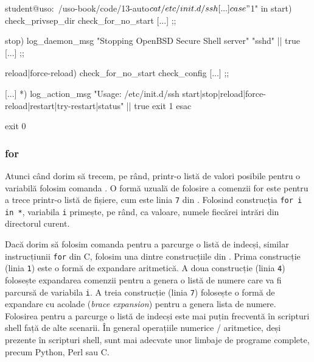 \begin{screen}[caption={Exemplu de folosire case: /etc/init.d/ssh},label={lst:auto:case-example}]
student@uso:~/uso-book/code/13-auto$ cat /etc/init.d/ssh
[...]
case "$1" in
  start)
	check_privsep_dir
	check_for_no_start
        [...]
	;;

  stop)
	log_daemon_msg "Stopping OpenBSD Secure Shell server" "sshd" || true
        [...]
	;;

  reload|force-reload)
	check_for_no_start
	check_config
        [...]
	;;

  [...]
  *)
	log_action_msg "Usage: /etc/init.d/ssh {start|stop|reload|force-reload|restart|try-restart|status}" || true
	exit 1
esac

exit 0
\end{screen}

\subsubsection{for}
\label{sec:auto:script-func:flow-control:for}

Atunci când dorim să trecem, pe rând, printr-o listă de valori posibile pentru o variabilă folosim comanda .
O formă uzuală de folosire a comenzii for este pentru a trece printr-o listă de fișiere, cum este linia \texttt{7} din .
Folosind construcția \texttt{for i in *}, variabila \texttt{i} primește, pe rând, ca valoare, numele fiecărei intrări din directorul curent.

Dacă dorim să folosim comanda  pentru a parcurge o listă de indecși, similar instrucțiunii \texttt{for} din C, folosim una dintre construcțiile din .
Prima construcție (linia \texttt{1}) este o formă de expandare aritmetică.
A doua construcție (linia \texttt{4}) folosește expandarea comenzii  pentru a genera o listă de numere care va fi parcursă de variabila \texttt{i}.
A treia construcție (linia \texttt{7}) folosește o formă de expandare cu acolade (\textit{brace expansion}) pentru a genera lista de numere.
Folosirea  pentru a parcurge o listă de indecși este mai puțin frecventă în scripturi shell față de alte scenarii.
În general operațiile numerice / aritmetice, deși prezente în scripturi shell, sunt mai adecvate unor limbaje de programe complete, precum Python, Perl sau C.


